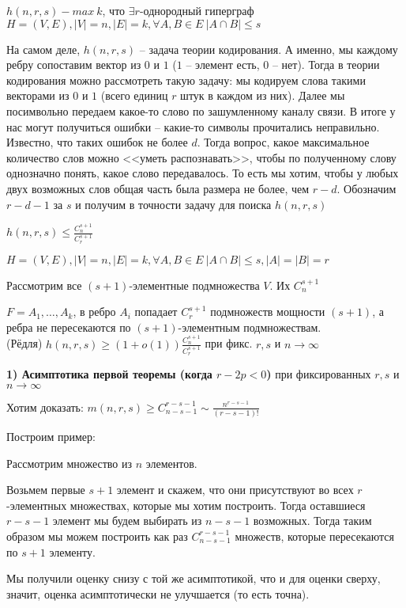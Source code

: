 \Def $h(n, r, s) - max \ k$, что $\exists r$-однородный гиперграф $H = (V, E), |V| = n, |E| = k, \forall A, B \in E \ |A \cap B| \leq s$

На самом деле, $h(n, r, s)$ -- задача теории кодирования. А именно, мы каждому ребру сопоставим вектор из $0$ и $1$ ($1$ -- элемент есть, $0$ -- нет). Тогда в теории кодирования можно рассмотреть такую задачу: мы кодируем слова такими векторами из $0$ и $1$ (всего единиц $r$ штук в каждом из них). Далее мы посимвольно передаем какое-то слово по зашумленному каналу связи. В итоге у нас могут получиться ошибки -- какие-то символы прочитались неправильно. Известно, что таких ошибок не более $d$. Тогда вопрос, какое максимальное количество слов можно <<уметь распознавать>>, чтобы по полученному слову однозначно понять, какое слово передавалось. То есть мы хотим, чтобы у любых двух возможных слов общая часть была размера не более, чем $r-d$. Обозначим $r-d-1$ за $s$ и получим в точности задачу для поиска $h(n, r, s)$

\Th $h(n, r, s) \leq \frac{C_n^{s+1}}{C_r^{s+1}}$

\Proof
$H = (V, E), |V|=n, |E|=k, \forall A, B \in E \ |A\cap B| \leq s, |A| = |B| = r$

Рассмотрим все $(s+1)$-элементные подмножества $V$. Их $C_n^{s+1}$

$F = {A_1, \ldots, A_k}$, в ребро $A_i$ попадает $C_r^{s+1}$ подмножеств мощности $(s+1)$, а ребра не пересекаются по $(s+1)$-элементным подмножествам.
\EndProof\\

\Th (Рёдля) $h(n, r, s) \geq (1 + o(1))\frac{C_n^{s+1}}{C_r^{s+1}}$ при фикс. $r, s$ и $n \to \infty$

\textbf{1) Асимптотика первой теоремы (когда $r - 2p < 0$)} при фиксированных $r, s$ и $n \to \infty$

Хотим доказать: $m(n,r,s) \geq C_{n-s-1}^{r-s-1} \sim \frac{n^{r-s-1}}{(r-s-1)!}$

Построим пример:

Рассмотрим множество из $n$ элементов.

Возьмем первые $s + 1$ элемент и скажем, что они присутствуют во всех $r$-элементных множествах, которые мы хотим построить. Тогда оставшиеся $r-s-1$ элемент мы будем выбирать из $n-s-1$ возможных. Тогда таким образом мы можем построить как раз $C_{n-s-1}^{r-s-1}$ множеств, которые пересекаются по $s+1$ элементу. 

Мы получили оценку снизу с той же асимптотикой, что и для оценки сверху, значит, оценка асимптотически не улучшается (то есть точна).

